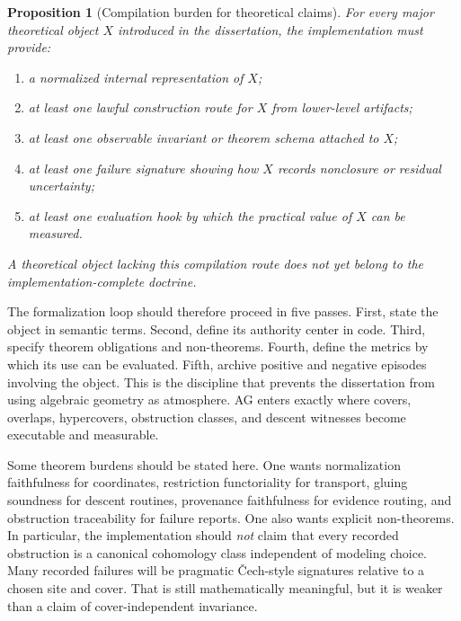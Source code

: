 \documentclass[11pt]{report}
\newtheorem{proposition}[definition]{Proposition}
\begin{document}
\begin{proposition}[Compilation burden for theoretical claims]
For every major theoretical object $X$ introduced in the dissertation, the implementation must provide:
\begin{enumerate}[label=(\roman*)]
\item a normalized internal representation of $X$;
\item at least one lawful construction route for $X$ from lower-level artifacts;
\item at least one observable invariant or theorem schema attached to $X$;
\item at least one failure signature showing how $X$ records nonclosure or residual uncertainty;
\item at least one evaluation hook by which the practical value of $X$ can be measured.
\end{enumerate}
A theoretical object lacking this compilation route does not yet belong to the implementation-complete doctrine.
\end{proposition}

The formalization loop should therefore proceed in five passes. First, state the object in semantic terms. Second, define its authority center in code. Third, specify theorem obligations and non-theorems. Fourth, define the metrics by which its use can be evaluated. Fifth, archive positive and negative episodes involving the object. This is the discipline that prevents the dissertation from using algebraic geometry as atmosphere. AG enters exactly where covers, overlaps, hypercovers, obstruction classes, and descent witnesses become executable and measurable.

Some theorem burdens should be stated here. One wants normalization faithfulness for coordinates, restriction functoriality for transport, gluing soundness for descent routines, provenance faithfulness for evidence routing, and obstruction traceability for failure reports. One also wants explicit non-theorems. In particular, the implementation should \emph{not} claim that every recorded obstruction is a canonical cohomology class independent of modeling choice. Many recorded failures will be pragmatic \v{C}ech-style signatures relative to a chosen site and cover. That is still mathematically meaningful, but it is weaker than a claim of cover-independent invariance.
\end{document}
